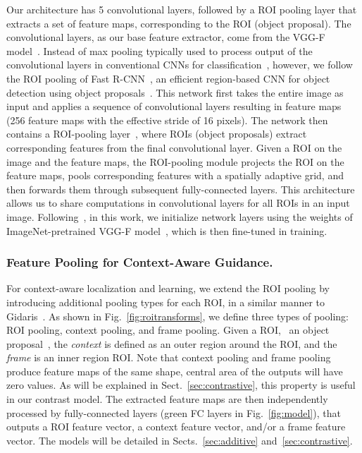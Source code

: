 Our architecture has 5 convolutional layers, followed by a ROI pooling
layer that extracts a set of feature maps, corresponding to the ROI (object
proposal). The convolutional layers, as our base feature extractor, come from
the VGG-F model~\cite{Chatfield14}. 
 Instead of max pooling typically used to process output of the convolutional layers in conventional
CNNs for classification~\cite{Krizhevsky:2012wl,Oquab:2015us}, however, we
follow the ROI pooling of Fast R-CNN~\cite{Girshick_2015_ICCV}, an efficient
region-based CNN for object detection using object
proposals~\cite{uijlings2013selective}. This network first takes the
entire image as input and applies a sequence of convolutional layers resulting in feature maps (256 feature maps with the effective stride of 16 pixels). The network then contains a ROI-pooling
layer~\cite{He:2014wg}, where ROIs (object proposals) extract corresponding
features from the final convolutional layer. Given a ROI on the image and the
feature maps, the ROI-pooling module projects the ROI on the feature maps, pools
corresponding features with a spatially adaptive grid, and then forwards
them through subsequent fully-connected layers. This architecture allows us to
share computations in convolutional layers for all ROIs in an input image.
Following~\cite{Bilen:2015uo}, in this work, we initialize network layers using the weights of 
ImageNet-pretrained VGG-F model~\cite{Chatfield14}, which is then fine-tuned in training.

\subsubsection{Feature Pooling for Context-Aware Guidance.} For context-aware localization and
learning, we extend the ROI pooling by introducing additional pooling types 
for each ROI, in a similar manner to Gidaris~\etal\cite{Gidaris:2015cx}. 
As shown in Fig.~\ref{fig:roitransforms}, 
we define three types of pooling: ROI pooling, context pooling, and frame pooling. 
Given a ROI, \ie ~an object proposal~\cite{uijlings2013selective}, 
the {\it context} is defined as an outer region around the ROI, and the {\it frame} is an inner region ROI. Note that context pooling and frame pooling produce feature maps of the same shape, \ie central area of the outputs will have zero values. As will be explained in Sect.~\ref{sec:contrastive}, this property is useful in our contrast model.
The extracted feature maps are then independently
processed by fully-connected layers (green FC layers in Fig.~\ref{fig:model}), that outputs a ROI feature vector, a context feature vector, and/or a frame feature vector.   
The models will be detailed in Sects.~\ref{sec:additive}
and~\ref{sec:contrastive}. 

